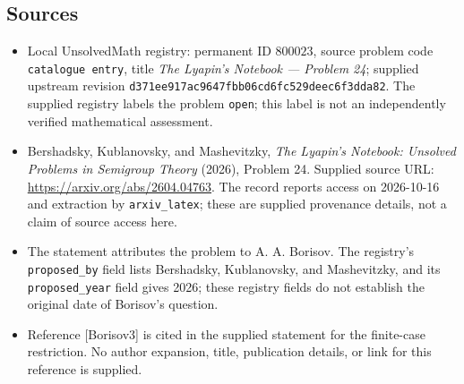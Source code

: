 \documentclass[11pt]{article}
\begin{document}
\subsection{Sources}
\begin{itemize}
\item Local UnsolvedMath registry: permanent ID \(800023\), source problem code \texttt{catalogue entry}, title \emph{The Lyapin's Notebook --- Problem 24}; supplied upstream revision \texttt{d371ee917ac9647fbb06cd6fc529deec6f3dda82}. The supplied registry labels the problem \texttt{open}; this label is not an independently verified mathematical assessment.
\item Bershadsky, Kublanovsky, and Mashevitzky, \emph{The Lyapin's Notebook: Unsolved Problems in Semigroup Theory} (2026), Problem 24. Supplied source URL: \url{https://arxiv.org/abs/2604.04763}. The record reports access on 2026-10-16 and extraction by \texttt{arxiv\_latex}; these are supplied provenance details, not a claim of source access here.
\item The statement attributes the problem to A. A. Borisov. The registry's \texttt{proposed\_by} field lists Bershadsky, Kublanovsky, and Mashevitzky, and its \texttt{proposed\_year} field gives 2026; these registry fields do not establish the original date of Borisov's question.
\item Reference [Borisov3] is cited in the supplied statement for the finite-case restriction. No author expansion, title, publication details, or link for this reference is supplied.
\end{itemize}
\end{document}
